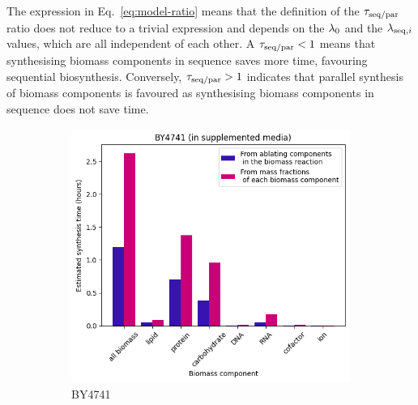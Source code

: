 The expression in Eq.\ \ref{eq:model-ratio} means that the definition of the $\tau_{\mathrm{seq}/\mathrm{par}}$ ratio does not reduce to a trivial expression and depends on the $\lambda_{0}$ and the $\lambda_{\mathrm{seq},i}$ values, which are all independent of each other.
A $\tau_{\mathrm{seq}/\mathrm{par}} < 1$ means that synthesising biomass components in sequence saves more time, favouring sequential biosynthesis.
Conversely, $\tau_{\mathrm{seq}/\mathrm{par}} > 1$ indicates that parallel synthesis of biomass components is favoured as synthesising biomass components in sequence does not save time.


\begin{figure}
  \centering
  \begin{subfigure}[htpb]{0.45\textwidth}
   \centering
   \includegraphics[width=\textwidth]{ablation_by4741}
   \caption{
     BY4741
   }
   \label{fig:model-ablation-by4741}
  \end{subfigure}
  \begin{subfigure}[htpb]{0.45\textwidth}
   \centering

\end{subfigure}
\end{figure}
